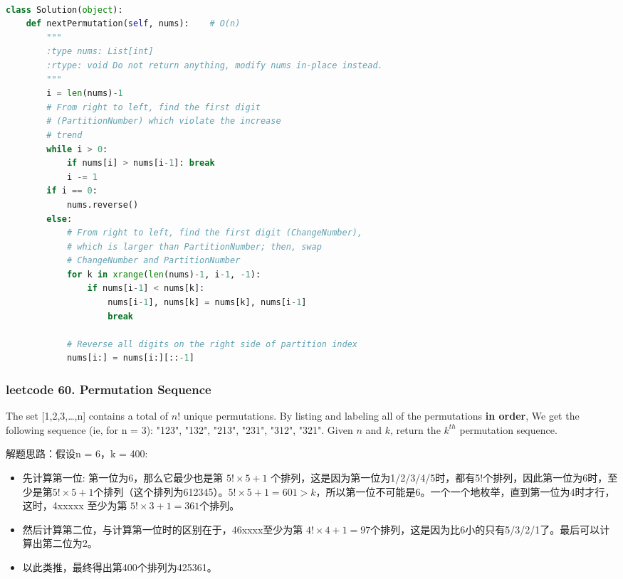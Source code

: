 \documentclass[a4paper,10pt]{article}
\begin{document}
\begin{lstlisting}[language=Python, caption=Problem31. Next Permutation]

class Solution(object):
    def nextPermutation(self, nums):    # O(n)
        """
        :type nums: List[int]
        :rtype: void Do not return anything, modify nums in-place instead.
        """
        i = len(nums)-1
        # From right to left, find the first digit 
        # (PartitionNumber) which violate the increase 
        # trend
        while i > 0:
            if nums[i] > nums[i-1]: break
            i -= 1
        if i == 0:
            nums.reverse()
        else:
            # From right to left, find the first digit (ChangeNumber), 
            # which is larger than PartitionNumber; then, swap 
            # ChangeNumber and PartitionNumber
            for k in xrange(len(nums)-1, i-1, -1):
                if nums[i-1] < nums[k]:
                    nums[i-1], nums[k] = nums[k], nums[i-1]
                    break

            # Reverse all digits on the right side of partition index
            nums[i:] = nums[i:][::-1]
\end{lstlisting}


\subsubsection{leetcode 60. Permutation Sequence}

The set [1,2,3,…,n] contains a total of $n!$ unique permutations. By listing and labeling all of the permutations \textbf{in order}, We get the following sequence (ie, for n = 3): "123", "132", "213", "231", "312", "321". Given $n$ and $k$, return the $k^{th}$ permutation sequence.\\

\begin{CJK*}{UTF8}{gbsn}
\noindent 解题思路：假设n = 6，k = 400:
\begin{itemize}
    \item 先计算第一位: 第一位为6，那么它最少也是第 $5! \times 5+1$ 个排列，这是因为第一位为1/2/3/4/5时，都有5!个排列，因此第一位为6时，至少是第$5! \times 5 + 1$个排列（这个排列为612345）。$5! \times 5 + 1 = 601 > k$，所以第一位不可能是6。一个一个地枚举，直到第一位为4时才行，这时，4xxxxx 至少为第 $5! \times 3 + 1 = 361$个排列。
    
    \item 然后计算第二位，与计算第一位时的区别在于，46xxxx至少为第 $4! \times 4 + 1 = 97$个排列，这是因为比6小的只有5/3/2/1了。最后可以计算出第二位为2。
    
    \item 以此类推，最终得出第400个排列为425361。
\end{itemize}
\end{CJK*}
\end{document}
